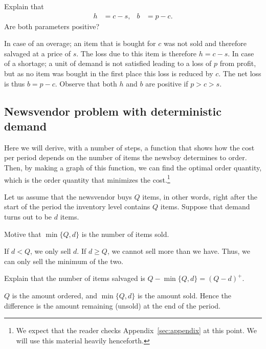 \begin{exercise}
Explain that 
\begin{align}\label{eq:133}
h&=c-s, & b&=p-c.
\end{align}
Are both parameters positive?
\begin{solution}
In case of an overage; an item that is bought for $c$ was not sold and therefore salvaged at a price of $s$. The loss due to this item is therefore $h=c-s$. In case of a shortage; a unit of demand is not satisfied leading to a loss of $p$ from profit, but as no item was bought in the first place this loss is reduced by $c$. The net loss is thus $b=p-c$. Observe that both $h$ and $b$ are positive if $p>c>s$.
\end{solution}
\end{exercise}



\subsection{Newsvendor problem with deterministic demand}

Here we will derive, with a number of steps,  a function that shows how the cost per period depends on the number of items the newsboy determines to order. Then, by making a graph of this function, we can find the optimal order quantity, which is the order quantity that  minimizes the cost.\footnote{We expect that the reader checks Appendix~\ref{sec:appendix} at this point. We will use this material heavily henceforth.}

Let us assume that the newsvendor buys $Q$ items, in other words, right after the start of the period the inventory level contains $Q$ items. Suppose that demand turns out to be $d$ items. 

\begin{exercise}
Motive that $\min\{Q,d\}$ is the number of items sold.
\begin{solution}
If $d<Q$, we only sell $d$. If $d\geq Q$, we cannot sell more than we have. Thus, we can only sell the minimum of the two.
\end{solution}
\end{exercise}


\begin{exercise}
Explain that the number of items salvaged is $Q-\min\{Q,d\} = (Q-d)^+$.
\begin{solution}
$Q$ is the amount ordered, and $\min\{Q, d\}$ is the amount sold. Hence the difference is the amount remaining (unsold) at the end of the period. 
\end{solution}
\end{exercise}

